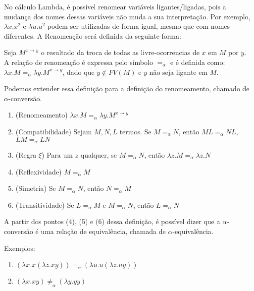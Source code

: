 \documentclass[../main.tex]{subfiles}
\begin{document}
No cálculo Lambda, é possível renomear variáveis ligantes/ligadas, pois a mudança dos nomes dessas variáveis não muda a sua interpretação. Por exemplo, $\lambda x. x^2$ e $\lambda u . u^2$ podem ser utilizadas de forma igual, mesmo que com nomes diferentes. A Renomeação será definida da seguinte forma:

\begin{definition}
    Seja $M^{x \to y}$ o resultado da troca de todas as livre-ocorrencias de $x$ em $M$ por $y$. A relação de renomeação é expressa pelo símbolo $=_{\alpha}$ e é definida como: $\lambda x . M =_{\alpha} \lambda y . M^{x \to y}$, dado que $y \not\in FV(M)$ e $y$ não seja ligante em $M$.
\end{definition}

Podemos extender essa definição para a definição do renomeamento, chamado de $\alpha$-conversão.

\begin{definition}
    \hfill
    \begin{enumerate}
        \item (Renomeamento) $\lambda x. M =_ {\alpha} \lambda y . M^{x \to y}$
        \item (Compatibilidade) Sejam $M, N, L$ termos. Se $M =_ {\alpha} N$, então $ML =_ {\alpha} NL$, $LM =_ {\alpha} LN$ 
        \item (Regra $\xi$) Para um $z$ qualquer, se $M =_{\alpha} N$, então $\lambda z . M =_{\alpha} \lambda z . N$
        \item (Reflexividade) $M =_ {\alpha} M$
        \item (Simetria) Se $M =_ {\alpha} N$, então $N =_ {\alpha} M$
        \item (Transitividade) Se $L =_ {\alpha} M$ e $M =_ {\alpha} N$, então $L =_ {\alpha} N$
    \end{enumerate}
\end{definition}

A partir dos pontos (4), (5) e (6) dessa definição, é possível dizer que a $\alpha$-conversão é uma relação de equivalência, chamada de $\alpha$-equivalência.

Exemplos: 

\begin{enumerate}
    \item $(\lambda x . x (\lambda z . xy)) =_ {\alpha} (\lambda u . u (\lambda z . uy))$
    \item $(\lambda x . xy) \neq_{\alpha} (\lambda y . yy)$
\end{enumerate}
\end{document}

